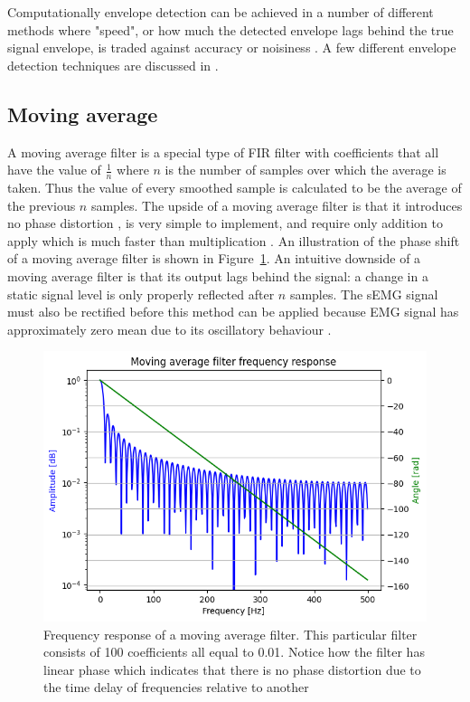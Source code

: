 Computationally envelope detection can be achieved in a number of different methods where "speed", or how much the detected envelope lags behind the true signal envelope, is traded against accuracy or noisiness \cite{dsp_good_bad_ugly}. A few different envelope detection techniques are discussed in \cite{rose2011electromyogram}.

\subsection{Moving average}
A moving average filter is a special type of FIR filter with coefficients that all have the value of $\frac{1}{n}$ where $n$ is the number of samples over which the average is taken. Thus the value of every smoothed sample is calculated to be the average of the previous $n$ samples. The upside of a moving average filter is that it introduces no phase distortion \cite{fir_filter_properties}, is very simple to implement, and require only addition to apply which is much faster than multiplication \cite{smith_moving_average_filters}. An illustration of the phase shift of a moving average filter is shown in Figure~\ref{fig:movingaverage_phaseshift}. An intuitive downside of a moving average filter is that its output lags behind the signal: a change in a static signal level is only properly reflected after $n$ samples. The sEMG signal must also be rectified before this method can be applied because EMG signal has approximately zero mean due to its oscillatory behaviour \cite{rose2011electromyogram}.

\begin{figure}[h!t]
	\begin{center}
		\includegraphics[width=0.7\columnwidth]{images/movingaverage_phaseshift.png}
	\end{center}
	\caption{Frequency response of a moving average filter. This particular filter consists of 100 coefficients all equal to 0.01. Notice how the filter has linear phase which indicates that there is no phase distortion due to the time delay of frequencies relative to another \cite{fir_filter_properties}}
	\label{fig:movingaverage_phaseshift}
\end{figure}



